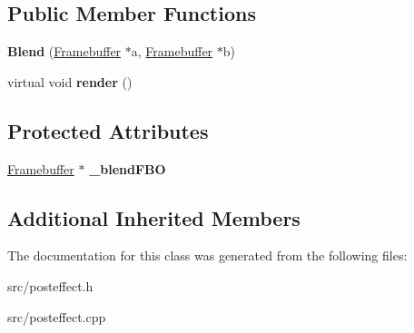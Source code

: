 \subsection*{Public Member Functions}
\begin{DoxyCompactItemize}
\item 
\hypertarget{class_blend_a808e2f2d6fd021ca43d22985d78d9465}{}{\bfseries Blend} (\hyperlink{class_framebuffer}{Framebuffer} $\ast$a, \hyperlink{class_framebuffer}{Framebuffer} $\ast$b)\label{class_blend_a808e2f2d6fd021ca43d22985d78d9465}

\item 
\hypertarget{class_blend_a5399ccf82cbcb03559bd9176f5959a84}{}virtual void {\bfseries render} ()\label{class_blend_a5399ccf82cbcb03559bd9176f5959a84}

\end{DoxyCompactItemize}
\subsection*{Protected Attributes}
\begin{DoxyCompactItemize}
\item 
\hypertarget{class_blend_ad557975355c427baaf87be7b91d6d7d8}{}\hyperlink{class_framebuffer}{Framebuffer} $\ast$ {\bfseries \+\_\+blend\+F\+B\+O}\label{class_blend_ad557975355c427baaf87be7b91d6d7d8}

\end{DoxyCompactItemize}
\subsection*{Additional Inherited Members}


The documentation for this class was generated from the following files\+:\begin{DoxyCompactItemize}
\item 
src/posteffect.\+h\item 
src/posteffect.\+cpp\end{DoxyCompactItemize}
